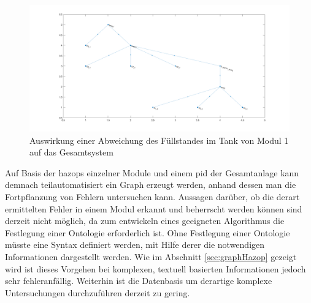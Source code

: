 \begin{figure}[h!tb]
\centering
\includegraphics[width=\textwidth]{bilder/04_code_Sys2TankL1FF.png}
\caption[Fehlerfortpflanzung im Gesamtsystem]{Auswirkung einer Abweichung des F\"ullstandes im Tank von Modul 1 auf das Gesamtsystem}
\label{fig:graph_sysGesFehlerfort}
\end{figure}

Auf Basis der \acp{hazop} einzelner Module und einem \ac{pid} der Gesamtanlage kann demnach teilautomatisiert ein Graph erzeugt werden, anhand dessen man die Fortpflanzung von Fehlern untersuchen kann. Aussagen dar\"uber, ob die derart ermittelten Fehler in einem Modul erkannt und beherrscht werden k\"onnen sind derzeit nicht m\"oglich, da zum entwickeln eines geeigneten Algorithmus die Festlegung einer Ontologie erforderlich ist. Ohne Festlegung einer Ontologie m\"usste eine Syntax definiert werden, mit Hilfe derer die notwendigen Informationen dargestellt werden. Wie im Abschnitt \ref{sec:graphHazop} gezeigt wird ist dieses Vorgehen bei komplexen, textuell basierten Informationen jedoch sehr fehleranf\"allig. Weiterhin ist die Datenbasis um derartige komplexe Untersuchungen durchzuf\"uhren derzeit zu gering. 
